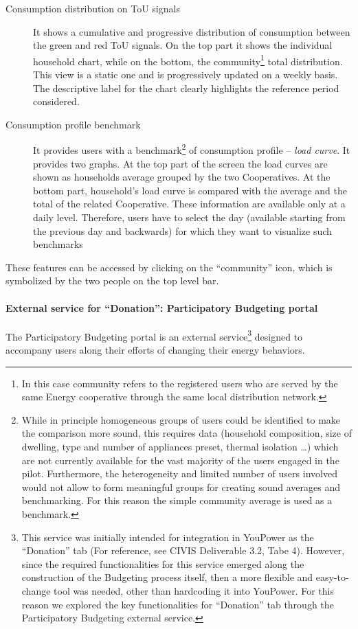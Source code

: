 \begin{description}
 \item[Consumption distribution on ToU signals] It shows a cumulative and progressive distribution of consumption between the green and red ToU signals.
 On the top part it shows the individual household chart, while on the bottom, the community\footnote{In this case community refers to the registered users who 
 are served by the same Energy cooperative through the same local distribution network.} total distribution. This view is a static one and is progressively updated on a weekly basis. The descriptive label for the chart clearly highlights the reference period considered.
 \item[Consumption profile benchmark] It provides users with a benchmark\footnote{While in principle homogeneous groups of users could be identified to make the comparison more sound, this requires data (household composition, size of dwelling, type and number of appliances preset, thermal isolation \ldots) which are not currently available for the vast majority of the users engaged in the pilot.
 Furthermore, the heterogeneity and limited number of users involved would not allow to form meaningful groups for creating sound averages and benchmarking. For this reason the simple community average is used as a benchmark.} of consumption profile -- \textit{load curve}.
 It provides two graphs. At the top part of the screen the load curves are shown as households average grouped by the two Cooperatives.
 At the bottom part, household's load curve is compared with the average and the total of the related Cooperative. These information are available only at a daily level. Therefore, users have to select the day (available starting from the previous day and backwards) for which they want to visualize such benchmarks
\end{description}
These features can be accessed by clicking on the ``community'' icon, which is symbolized by the two people on the top level bar.


\paragraph{External service for ``Donation'': Participatory Budgeting portal} 

The Participatory Budgeting portal is an external service\footnote{This service was initially intended for integration in YouPower as the ``Donation'' tab
(For reference, see CIVIS Deliverable 3.2, Tabe 4). However, since the required functionalities for this service emerged along the construction of the Budgeting process itself, then a more flexible
and easy-to-change tool was needed, other than hardcoding it into YouPower. For this reason we explored the key functionalities for ``Donation'' tab through the Participatory Budgeting external service.}
designed to accompany users along their efforts of changing their energy behaviors.

